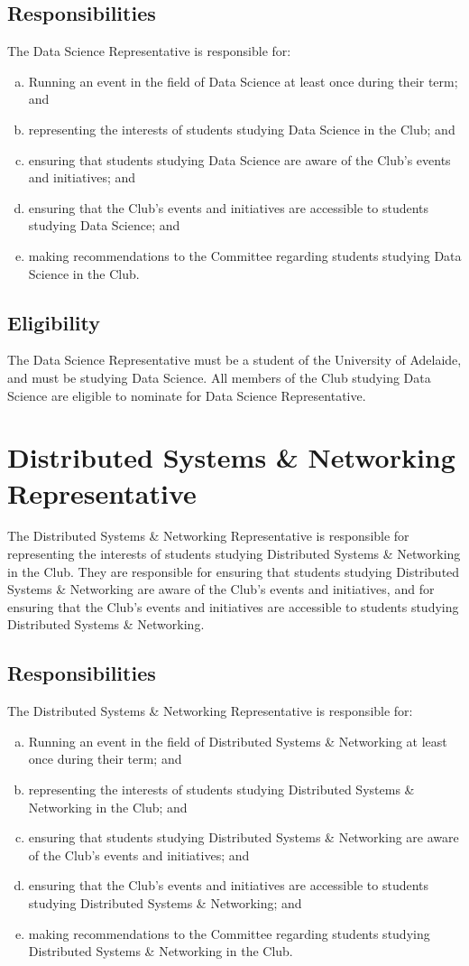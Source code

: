 \documentclass[11pt]{report}
\begin{document}
\subsection{Responsibilities}
The Data Science Representative is responsible for:
\begin{enumerate}[(a)]
    \item Running an event in the field of Data Science at least once during their term; and
    \item representing the interests of students studying Data Science in the Club; and
    \item ensuring that students studying Data Science are aware of the Club's events and initiatives; and
    \item ensuring that the Club's events and initiatives are accessible to students studying Data Science; and
    \item making recommendations to the Committee regarding students studying Data Science in the Club.
\end{enumerate}
\subsection{Eligibility}
The Data Science Representative must be a student of the University of Adelaide, and must be studying Data Science. All members of the Club studying Data Science are eligible to nominate for Data Science Representative.

\section{Distributed Systems \& Networking Representative}
The Distributed Systems \& Networking Representative is responsible for representing the interests of students studying Distributed Systems \& Networking in the Club. They are responsible for ensuring that students studying Distributed Systems \& Networking are aware of the Club's events and initiatives, and for ensuring that the Club's events and initiatives are accessible to students studying Distributed Systems \& Networking.
\subsection{Responsibilities}
The Distributed Systems \& Networking Representative is responsible for:
\begin{enumerate}[(a)]
    \item Running an event in the field of Distributed Systems \& Networking at least once during their term; and
    \item representing the interests of students studying Distributed Systems \& Networking in the Club; and
    \item ensuring that students studying Distributed Systems \& Networking are aware of the Club's events and initiatives; and
    \item ensuring that the Club's events and initiatives are accessible to students studying Distributed Systems \& Networking; and
    \item making recommendations to the Committee regarding students studying Distributed Systems \& Networking in the Club.
\end{enumerate}
\end{document}
